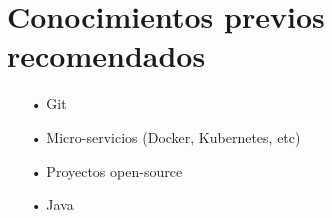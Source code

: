 \documentclass[12pt,a4paper, english]{article}
\begin{document}
\section{Conocimientos previos recomendados}
\begin{itemize}
    \item[•] Git
    \item[•] Micro-servicios (Docker, Kubernetes, etc)
    \item[•] Proyectos open-source
    \item[•] Java
\end{itemize}
\end{document}
